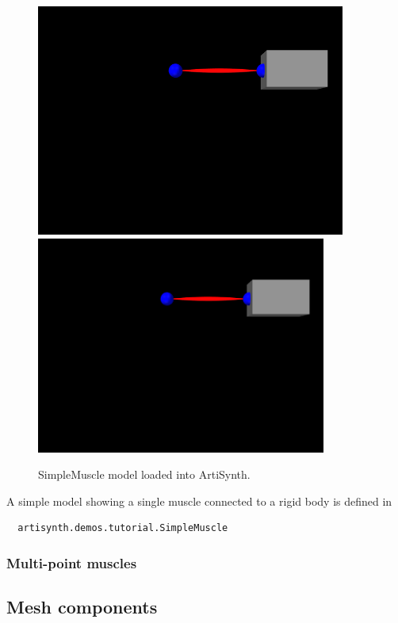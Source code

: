 \begin{figure}[h]
\begin{center}
\iflatexml
 \includegraphics[]{images/SimpleMuscle}
\else
 \includegraphics[width=3.75in]{images/SimpleMuscle}
\fi
\end{center}
\caption{SimpleMuscle model loaded into ArtiSynth.}
\label{SimpleMuscle:fig}
\end{figure}

A simple model showing a single muscle connected to a rigid
body is defined in
%
\begin{verbatim}
  artisynth.demos.tutorial.SimpleMuscle
\end{verbatim}
%


\subsubsection{Multi-point muscles}

\subsection{Mesh components}


